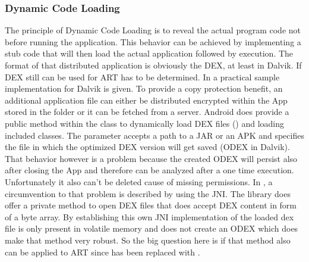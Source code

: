 \subsubsection{Dynamic Code Loading}\label{section:dynamic_code_loading}
The principle of Dynamic Code Loading is to reveal the actual program code
not before running the application. This behavior can be achieved by
implementing a stub code that will then load the actual application
followed by execution. The format of that distributed application is
obviously the DEX, at least in Dalvik. If DEX still can be used
for ART has to be determined. In \parencite{dexfileclass} a practical
sample implementation for Dalvik is given.
To provide a copy protection benefit, an additional application file can either be distributed encrypted within the App stored in the  folder or it can be fetched from a server.
Android does provide a public method within
the  class to dynamically load DEX files
()
and loading included classes. The  parameter accepts
a path to a JAR or an APK and  specifies
the file in which the optimized DEX version will get saved (ODEX in Dalvik).
That behavior however is a problem because the created ODEX will persist
also after closing the App and therefore can be analyzed after a one time
execution. Unfortunately it also can't be deleted cause of missing permissions.
In \parencite{code_protection},
a circumvention to that problem is described by using the JNI.
The  library does offer a private method to open DEX files
that does accept DEX content in form of a byte array.
By establishing this own JNI implementation of
 the loaded dex file is only present
in volatile memory and does not create an ODEX \parencite{code_protection}
which does make that method very robust. So the big question here is if
that method also can be applied to ART since  has been replaced
with .

